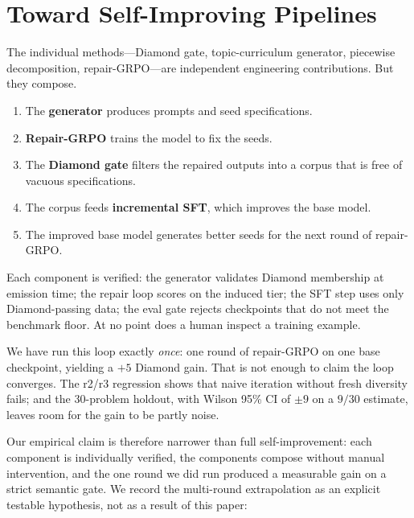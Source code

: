 \documentclass[11pt]{article}
\begin{document}
\section{Toward Self-Improving Pipelines}
\label{sec:selfimprove}

The individual methods---Diamond gate, topic-curriculum generator,
piecewise decomposition, repair-GRPO---are independent engineering
contributions.  But they compose.

\begin{enumerate}[leftmargin=1.6em, itemsep=1pt]
\item The \textbf{generator} produces prompts and seed
  specifications.
\item \textbf{Repair-GRPO} trains the model to fix the seeds.
\item The \textbf{Diamond gate} filters the repaired outputs into a
  corpus that is free of vacuous specifications.
\item The corpus feeds \textbf{incremental SFT}, which improves the
  base model.
\item The improved base model generates better seeds for the next
  round of repair-GRPO.
\end{enumerate}

Each component is verified: the generator validates Diamond membership
at emission time; the repair loop scores on the induced tier; the SFT
step uses only Diamond-passing data; the eval gate rejects checkpoints
that do not meet the benchmark floor.  At no point does a human
inspect a training example.

We have run this loop exactly \emph{once}: one round of repair-GRPO
on one base checkpoint, yielding a $+5$ Diamond gain.  That is not
enough to claim the loop converges.  The r2/r3 regression shows that
naive iteration without fresh diversity fails; and the 30-problem
holdout, with Wilson 95\% CI of $\pm 9$ on a $9/30$ estimate, leaves
room for the gain to be partly noise.

Our empirical claim is therefore narrower than full self-improvement:
each component is individually verified, the components compose
without manual intervention, and the one round we did run produced
a measurable gain on a strict semantic gate.  We record the
multi-round extrapolation as an explicit testable hypothesis, not
as a result of this paper:
\end{document}
